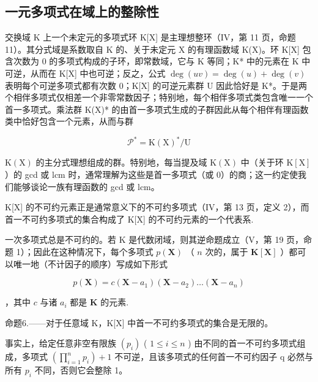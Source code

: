 \subsection{一元多项式在域上的整除性}

交换域 K 上一个未定元的多项式环 K{[}X{]} 是主理想整环（IV，第 11 页，命题 11）。其分式域是系数取自 K 的、关于未定元 X 的有理函数域 K(X)。环 K{[}X{]} 包含次数为 0 的多项式构成的子环，即常数域，它与 K 等同；K* 中的元素在 K 中可逆，从而在 K{[}X{]} 中也可逆；反之，公式 \(\deg(uv) = \deg(u) + \deg(v)\) 表明每个可逆多项式都有次数 0；K{[}X{]} 的可逆元素群 U 因此恰好是 K*。于是两个相伴多项式仅相差一个非零常数因子；特别地，每个相伴多项式类包含唯一一个首一多项式。乘法群 K(X)* 的由首一多项式生成的子群因此从每个相伴有理函数类中恰好包含一个元素，从而与群

\[
\mathcal {P} ^ {*} = \mathrm{K} (\mathrm{X}) ^ {*} / \mathrm{U}
\]

\(\mathrm{K}(\mathrm{X})\) 的主分式理想组成的群。特别地，每当提及域 \(\mathrm{K}(\mathrm{X})\) 中（关于环 \(\mathrm{K}[\mathrm{X}]\) ）的 gcd 或 lcm 时，通常理解为这些是首一多项式（或 0）的商；这一约定使我们能够谈论一族有理函数的 gcd 或 lcm。

K{[}X{]} 的不可约元素正是通常意义下的不可约多项式（IV，第 13 页，定义 2），而首一不可约多项式的集合构成了 K{[}X{]} 的不可约元素的一个代表系.

一次多项式总是不可约的。若 K 是代数闭域，则其逆命题成立（V，第 19 页，命题 1）；因此在这种情况下，每个多项式 \(p(\mathbf{X})\) （ \(n\) 次的，属于 \(\mathbf{K}[\mathbf{X}]\) ）都可以唯一地（不计因子的顺序）写成如下形式

\[
p (\mathbf {X}) = c \left(\mathbf {X} - a _ {1}\right) \left(\mathbf {X} - a _ {2}\right) \dots \left(\mathbf {X} - a _ {n}\right)
\]

，其中 \(c\) 与诸 \(a_{i}\) 都是 \(\mathbf{K}\) 的元素.

命题6.——对于任意域 K，K{[}X{]} 中首一不可约多项式的集合是无限的。

事实上，给定任意非空有限族 \((p_{i})\) ( \(1 \leqslant i \leqslant n\) ) 由不同的首一不可约多项式组成，多项式 \(\left(\prod_{i=1}^{n} p_{i}\right) + 1\) 不可逆，且该多项式的任何首一不可约因子 q 必然与所有 \(p_{i}\) 不同，否则它会整除 1。

